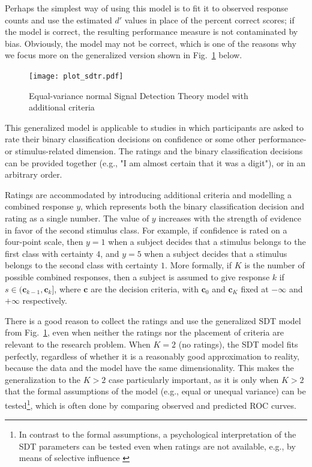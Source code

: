 \documentclass[a4paper,man,apacite,floatsintext]{apa6}
\begin{document}
Perhaps the simplest way of using this model is to fit it to observed
response counts and use the estimated $d'$ values in place of the
percent correct scores; if the model is correct, the resulting
performance measure is not contaminated by bias. Obviously, the model
may not be correct, which is one of the reasons why we focus more on
the generalized version shown in Fig.~\ref{sdtr} below.


\begin{figure}[H]
  \centering
  \texttt{[image: plot\_sdtr.pdf]}
  \caption{Equal-variance normal Signal Detection Theory model with
    additional criteria}
  \label{sdtr}
\end{figure}

This generalized model is applicable to studies in which participants
are asked to rate their binary classification decisions on confidence
or some other performance- or stimulus-related dimension. The ratings
and the binary classification decisions can be provided together
(e.g., "I am almost certain that it was a digit"), or in an arbitrary
order.

Ratings are accommodated by introducing additional criteria and
modelling a combined response $y$, which represents both the binary
classification decision and rating as a single number. The value of
$y$ increases with the strength of evidence in favor of the second
stimulus class. For example, if confidence is rated on a four-point
scale, then $y = 1$ when a subject decides that a stimulus belongs to
the first class with certainty $4$, and $y = 5$ when a subject decides
that a stimulus belongs to the second class with certainty $1$. More
formally, if $K$ is the number of possible combined responses, then a
subject is assumed to give response $k$ if
$s \in (\bm{c}_{k-1},\bm{c}_k]$, where $\bm{c}$ are the decision
criteria, with $\bm{c}_0$ and $\bm{c}_K$ fixed at $-\infty$ and
$+\infty$ respectively.

There is a good reason to collect the ratings and use the generalized
SDT model from Fig.~\ref{sdtr}, even when neither the ratings nor the
placement of criteria are relevant to the research problem. When
$K = 2$ (no ratings), the SDT model fits perfectly, regardless of
whether it is a reasonably good approximation to reality, because the
data and the model have the same dimensionality. This makes the
generalization to the $K > 2$ case particularly important, as it is
only when $K > 2$ that the formal assumptions of the model (e.g.,
equal or unequal variance) can be tested\footnote{In contrast to the
  formal assumptions, a psychological interpretation of the SDT
  parameters can be tested even when ratings are not available, e.g.,
  by means of selective influence \cite{sternberg2001separate}}, which
is often done by comparing observed and predicted ROC curves.
\end{document}
